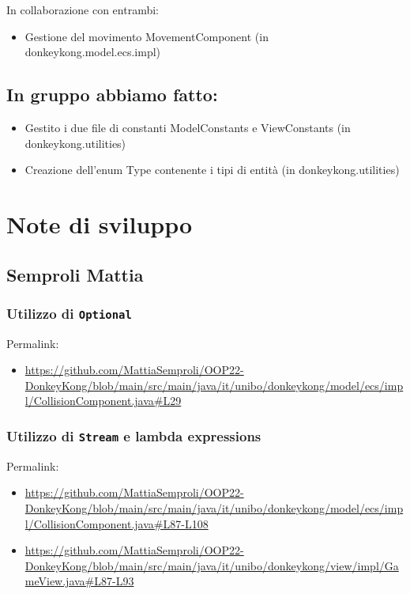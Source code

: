 \documentclass[a4paper,12pt]{report}
\begin{document}
In collaborazione con entrambi:
\begin{itemize}
    \item Gestione del movimento MovementComponent (in donkeykong.model.ecs.impl)
\end{itemize}

\subsection*{In gruppo abbiamo fatto:}
\begin{itemize}
    \item Gestito i due file di constanti ModelConstants e ViewConstants (in donkeykong.utilities)
    \item Creazione dell’enum Type contenente i tipi di entità (in donkeykong.utilities)
\end{itemize}

\section{Note di sviluppo}
\subsection*{Semproli Mattia}

\subsubsection{Utilizzo di \texttt{Optional}}
Permalink:
\begin{itemize}
    \item \url{https://github.com/MattiaSemproli/OOP22-DonkeyKong/blob/main/src/main/java/it/unibo/donkeykong/model/ecs/impl/CollisionComponent.java#L29}
\end{itemize}

\subsubsection{Utilizzo di \texttt{Stream} e lambda expressions}
Permalink:
\begin{itemize}
    \item \url{https://github.com/MattiaSemproli/OOP22-DonkeyKong/blob/main/src/main/java/it/unibo/donkeykong/model/ecs/impl/CollisionComponent.java#L87-L108}
    \item \url{https://github.com/MattiaSemproli/OOP22-DonkeyKong/blob/main/src/main/java/it/unibo/donkeykong/view/impl/GameView.java#L87-L93}
\end{itemize}
\end{document}
